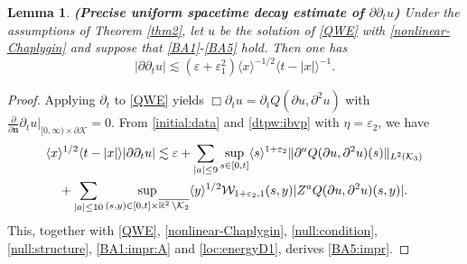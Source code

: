 \documentclass[11pt,twoside]{article}
\def\cK{\mathcal K}
\def\cW{\mathcal W}
\def\R{\mathop{\mathbb R\kern 0pt}\nolimits}
\def\ds{\displaystyle}
\def\p{\partial}
\def\ve{\varepsilon}
\def\ls{\lesssim}
\def\bn{\mathbf{n}}
\newcommand{\w}[1]{\langle {#1} \rangle}
\theoremstyle{plain}
\newtheorem{lemma}[theorem]{Lemma}
\theoremstyle{definition}
\numberwithin{equation}{section}
\begin{document}
\begin{lemma}
{\bf (Precise uniform spacetime decay estimate of $\ds\p\p_tu$)}
Under the assumptions of Theorem \ref{thm2}, let $u$ be the solution of \eqref{QWE} with \eqref{nonlinear-Chaplygin}
and suppose that \eqref{BA1}-\eqref{BA5} hold.
Then one has
\begin{equation}\label{BA5:impr}
|\p\p_tu|\ls(\ve+\ve_1^2)\w{x}^{-1/2}\w{t-|x|}^{-1}.
\end{equation}
\end{lemma}
\begin{proof}
Applying $\p_t$ to \eqref{QWE} yields $\Box\p_tu=\p_tQ(\p u,\p^2u)$ with $\frac{\p}{\p\bn}\p_tu|_{[0,\infty)\times\p\cK}=0$.
From \eqref{initial:data} and \eqref{dtpw:ibvp} with $\eta=\ve_2$, we have
\begin{equation*}
\begin{split}
&\w{x}^{1/2}\w{t-|x|}|\p\p_tu|\ls\ve+\sum_{|a|\le9}\sup_{s\in[0,t]}\w{s}^{1+\ve_2}\|\p^aQ(\p u,\p^2u)(s)\|_{L^2(\cK_3)}\\
&\quad+\sum_{|a|\le10}\sup_{(s,y)\in[0,t]\times\overline{\R^2\setminus\cK_2}}\w{y}^{1/2}\cW_{1+\ve_2,1}(s,y)|Z^aQ(\p u,\p^2u)(s,y)|.
\end{split}
\end{equation*}
This, together with \eqref{QWE}, \eqref{nonlinear-Chaplygin}, \eqref{null:condition}, \eqref{null:structure}, \eqref{BA1:impr:A} and \eqref{loc:energyD1}, derives \eqref{BA5:impr}.
\end{proof}
\end{document}
